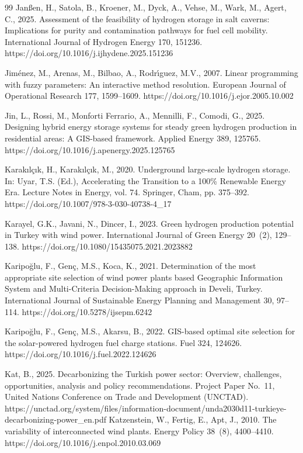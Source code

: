 \documentclass[preprint,12pt,authoryear]{elsarticle}
\begin{document}
\begin{thebibliography}{99}
Jan{\ss}en, H., Satola, B., Kroener, M., Dyck, A., Vehse, M., Wark, M., Agert, C., 2025. Assessment of the feasibility of hydrogen storage in salt caverns: Implications for purity and contamination pathways for fuel cell mobility. International Journal of Hydrogen Energy 170, 151236. https://doi.org/10.1016/j.ijhydene.2025.151236

Jim{\'e}nez, M., Arenas, M., Bilbao, A., Rodr{\'\i}guez, M.V., 2007. Linear programming with fuzzy parameters: An interactive method resolution. European Journal of Operational Research 177, 1599--1609. https://doi.org/10.1016/j.ejor.2005.10.002

Jin, L., Rossi, M., Monforti Ferrario, A., Mennilli, F., Comodi, G., 2025. Designing hybrid energy storage systems for steady green hydrogen production in residential areas: A GIS-based framework. Applied Energy 389, 125765. https://doi.org/10.1016/j.apenergy.2025.125765

Karak{\i}l{\c{c}}{\i}k, H., Karak{\i}l{\c{c}}{\i}k, M., 2020. Underground large-scale hydrogen storage. In: Uyar, T.S. (Ed.), Accelerating the Transition to a 100\% Renewable Energy Era. Lecture Notes in Energy, vol. 74. Springer, Cham, pp. 375--392. https://doi.org/10.1007/978-3-030-40738-4\_17

Karayel, G.K., Javani, N., Dincer, I., 2023. Green hydrogen production potential in Turkey with wind power. International Journal of Green Energy 20~(2), 129--138. https://doi.org/10.1080/15435075.2021.2023882

Karipo{\u{g}}lu, F., Gen{\c{c}}, M.S., Koca, K., 2021. Determination of the most appropriate site selection of wind power plants based Geographic Information System and Multi-Criteria Decision-Making approach in Develi, Turkey. International Journal of Sustainable Energy Planning and Management 30, 97--114. https://doi.org/10.5278/ijsepm.6242

Karipo{\u{g}}lu, F., Gen{\c{c}}, M.S., Akarsu, B., 2022. GIS-based optimal site selection for the solar-powered hydrogen fuel charge stations. Fuel 324, 124626. https://doi.org/10.1016/j.fuel.2022.124626

Kat, B., 2025. Decarbonizing the Turkish power sector: Overview, challenges, opportunities, analysis and policy recommendations. Project Paper No.~11, United Nations Conference on Trade and Development (UNCTAD). https://unctad.org/system/files/information-document/unda2030d11-turkieye-decarbonizing-power\_en.pdf
Katzenstein, W., Fertig, E., Apt, J., 2010. The variability of interconnected wind plants. Energy Policy 38~(8), 4400--4410. https://doi.org/10.1016/j.enpol.2010.03.069


\end{thebibliography}
\end{document}
